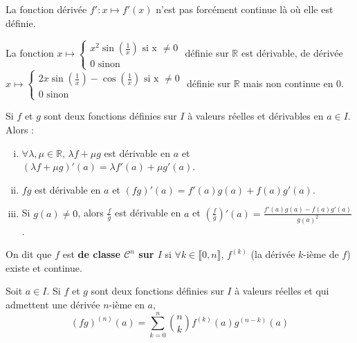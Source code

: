 
	\begin{remark}
		La fonction dérivée $f' : x \mapsto f'(x)$ n'est pas forcément continue là où elle est définie.
	\end{remark}

	\begin{example}
		La fonction $x \mapsto \begin{cases}
			x^2 \sin \left(\frac{1}{x}\right) \text{ si x } \neq 0 \\
			0 \text{ sinon}
		\end{cases}$ définie sur $\mathbb{R}$ est dérivable, de dérivée $x \mapsto \begin{cases}
		2x \sin \left(\frac{1}{x}\right) - \cos \left(\frac{1}{x}\right) \text{ si x } \neq 0 \\
		0 \text{ sinon}
		\end{cases}$ définie sur $\mathbb{R}$ mais non continue en $0$.
	\end{example}

	\begin{proposition}
		Si $f$ et $g$ sont deux fonctions définies sur $I$ à valeurs réelles et dérivables en $a \in I$. Alors :
		\begin{enumerate}[(i)]
			\item $\forall \lambda, \mu \in \mathbb{R}, \, \lambda f + \mu g$ est dérivable en $a$ et $(\lambda f + \mu g)'(a) = \lambda f'(a) + \mu g'(a)$.
			\item $fg$ est dérivable en $a$ et $(fg)'(a) = f'(a) g(a) + f(a) g'(a)$.
			\item Si $g(a) \neq 0$, alors $\frac{f}{g}$ est dérivable en $a$ et $\left(\frac{f}{g}\right)'(a) = \frac{f'(a) g(a) - f(a) g'(a)}{g(a)^2}$.
 		\end{enumerate}
	\end{proposition}

	\begin{definition}
		On dit que $f$ est \textbf{de classe $\mathcal{C}^n$ sur $I$} si $\forall k \in \llbracket 0, n \rrbracket$, $f^{(k)}$ (la dérivée $k$-ième de $f$) existe et continue.
	\end{definition}

	\begin{proposition}
		Soit $a \in I$. Si $f$ et $g$ sont deux fonctions définies sur $I$ à valeurs réelles et qui admettent une dérivée $n$-ième en $a$,
		\[ (fg)^{(n)}(a) = \sum_{k=0}^n \binom{n}{k} f^{(k)}(a) g^{(n-k)}(a) \]
	\end{proposition}

